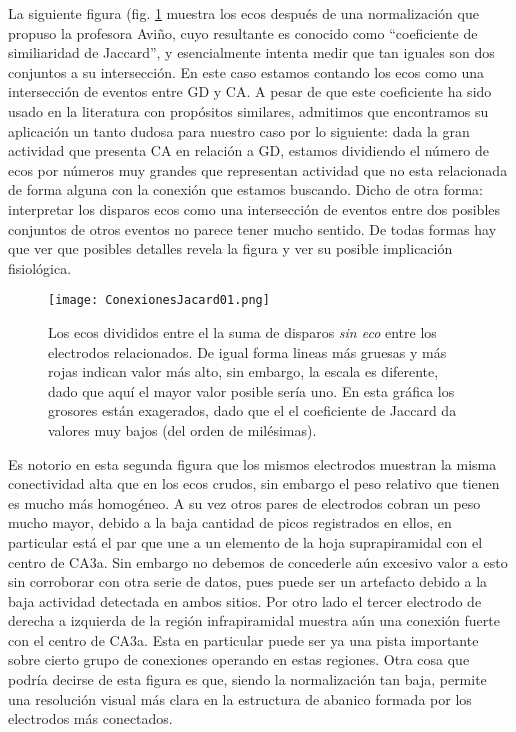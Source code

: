 \documentclass{article}
\begin{document}
La siguiente figura (fig. \ref{Jacard} muestra los ecos 
después de  una normalización que propuso
la profesora Aviño, cuyo resultante es conocido como 
``coeficiente de similiaridad de Jaccard'', y esencialmente 
intenta medir que tan iguales son dos conjuntos a su intersección. 
En este caso estamos contando los ecos como una intersección de eventos
entre GD y CA. A pesar de que este coeficiente ha sido usado en la literatura
con propósitos similares, admitimos que encontramos su aplicación un 
tanto dudosa para nuestro caso por lo siguiente: dada la gran actividad
que presenta CA en relación a GD, estamos dividiendo el número
de ecos por números muy  grandes que representan actividad que no esta
relacionada de forma alguna con la conexión que estamos buscando. Dicho de 
otra forma: interpretar los disparos ecos como una intersección de
eventos entre dos posibles conjuntos de otros eventos no parece
tener mucho sentido. De todas formas  hay que ver que posibles
detalles revela la figura y ver su posible implicación fisiológica.

\begin{figure}[h]
\centering
\texttt{[image: ConexionesJacard01.png]}
\caption{ Los ecos divididos entre el la suma de disparos
\emph{sin eco} entre los electrodos relacionados. De igual forma
lineas más gruesas y más rojas indican valor más alto, sin embargo,
la escala es diferente, dado que aquí el mayor valor posible sería uno.
En esta gráfica los grosores están exagerados, dado que el el 
coeficiente de Jaccard da valores muy bajos (del orden de milésimas).
}\label{Jacard}
\end{figure}

Es notorio en esta segunda figura que los mismos electrodos muestran
la misma conectividad alta que en los ecos crudos, sin embargo el 
peso relativo que tienen es mucho más homogéneo. A su vez otros pares
de electrodos cobran un peso mucho mayor, debido a la baja cantidad
de picos registrados en ellos, en particular está el par que une
a un elemento de la hoja suprapiramidal con el centro de CA3a. 
Sin embargo no debemos de concederle aún excesivo valor a esto
sin corroborar con otra serie de datos, pues puede ser un 
artefacto debido a la baja actividad detectada en ambos sitios. 
Por otro lado el tercer electrodo de derecha a izquierda de la región
infrapiramidal muestra aún una conexión fuerte con el centro de 
CA3a. Esta en particular puede ser ya una pista importante
sobre cierto grupo de conexiones operando en estas regiones. Otra
cosa que podría decirse de esta figura es que, siendo la normalización
tan baja, permite una resolución visual más clara en la 
estructura de abanico formada por los electrodos más conectados.
\end{document}
